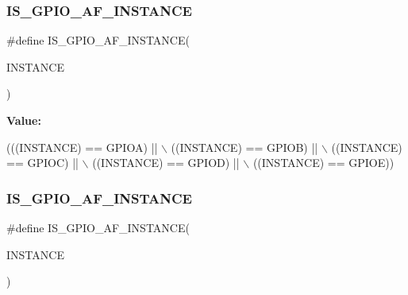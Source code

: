 \subsubsection{\texorpdfstring{I\+S\+\_\+\+G\+P\+I\+O\+\_\+\+A\+F\+\_\+\+I\+N\+S\+T\+A\+N\+CE}{IS\_GPIO\_AF\_INSTANCE}\hspace{0.1cm}{\footnotesize\ttfamily [14/16]}}
{\footnotesize\ttfamily \#define I\+S\+\_\+\+G\+P\+I\+O\+\_\+\+A\+F\+\_\+\+I\+N\+S\+T\+A\+N\+CE(\begin{DoxyParamCaption}\item[{}]{I\+N\+S\+T\+A\+N\+CE }\end{DoxyParamCaption})}

{\bfseries Value\+:}
\begin{DoxyCode}
(((INSTANCE) == GPIOA) || \(\backslash\)
                                         ((INSTANCE) == GPIOB) || \(\backslash\)
                                         ((INSTANCE) == GPIOC) || \(\backslash\)
                                         ((INSTANCE) == GPIOD) || \(\backslash\)
                                         ((INSTANCE) == GPIOE))
\end{DoxyCode}
\mbox{\label{group___exported__macro_ga9d2e0c4bb80b983730a3a5d98d56f535}} 
\subsubsection{\texorpdfstring{I\+S\+\_\+\+G\+P\+I\+O\+\_\+\+A\+F\+\_\+\+I\+N\+S\+T\+A\+N\+CE}{IS\_GPIO\_AF\_INSTANCE}\hspace{0.1cm}{\footnotesize\ttfamily [15/16]}}
{\footnotesize\ttfamily \#define I\+S\+\_\+\+G\+P\+I\+O\+\_\+\+A\+F\+\_\+\+I\+N\+S\+T\+A\+N\+CE(\begin{DoxyParamCaption}\item[{}]{I\+N\+S\+T\+A\+N\+CE }\end{DoxyParamCaption})}

